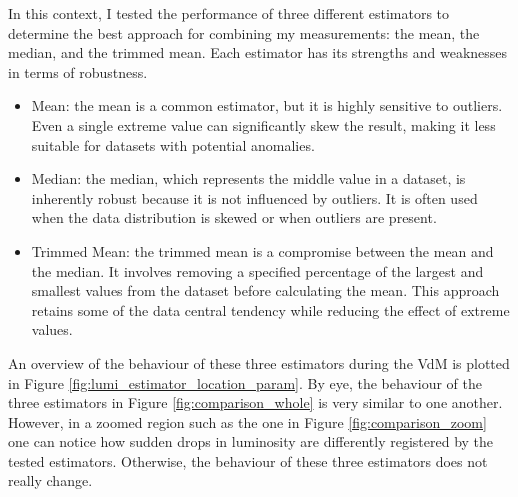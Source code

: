 In this context, I tested the performance of three different estimators to determine the best approach for combining my measurements: the mean, the median, and the trimmed mean. Each estimator has its strengths and weaknesses in terms of robustness.

\begin{itemize}
\item Mean: the mean is a common estimator, but it is highly sensitive to outliers. Even a single extreme value can significantly skew the result, making it less suitable for datasets with potential anomalies.
\item Median: the median, which represents the middle value in a dataset, is inherently robust because it is not influenced by outliers. It is often used when the data distribution is skewed or when outliers are present.
\item Trimmed Mean: the trimmed mean is a compromise between the mean and the median. It involves removing a specified percentage of the largest and smallest values from the dataset before calculating the mean. This approach retains some of the data central tendency while reducing the effect of extreme values.
\end{itemize}


An overview of the behaviour of these three estimators during the VdM is plotted in Figure \ref{fig:lumi_estimator_location_param}. By eye, the behaviour of the three estimators in Figure \ref{fig:comparison_whole} is very similar to one another. However, in a zoomed region such as the one in Figure \ref{fig:comparison_zoom} one can notice how sudden drops in luminosity are differently registered by the tested estimators. Otherwise, the behaviour of these three estimators does not really change.
 

